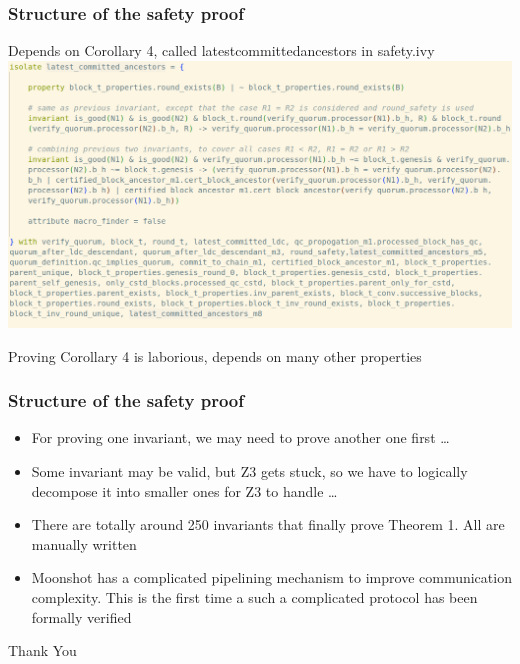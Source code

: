 \documentclass{beamer}
\begin{document}
\begin{frame}
    \frametitle{Structure of the safety proof}

    Depends on Corollary 4, called
    latest\textunderscore{}committed\textunderscore{}ancestors in
    safety.ivy
    \includegraphics[scale=0.25]{Corollary4.png}

    Proving Corollary 4 is laborious, depends on many other properties
\end{frame}

\begin{frame}
    \frametitle{Structure of the safety proof}
    \begin{itemize}
        \item For proving one invariant, we may need to prove another
            one first \dots
            \pause
            \vfill
        \item Some invariant may be valid, but Z3 gets stuck, so we
            have to logically decompose it into smaller ones for Z3 to
            handle \dots
            \pause
            \vfill
        \item There are totally around 250 invariants that finally
            prove Theorem 1. All are manually written
            \pause
            \vfill
        \item Moonshot has a complicated pipelining mechanism to
            improve communication complexity. This is the first time a
            such a complicated protocol has been formally verified
    \end{itemize}
    \pause
    \vfill
    \begin{center}
        \Large{Thank You}
    \end{center}
\end{frame}
\end{document}
